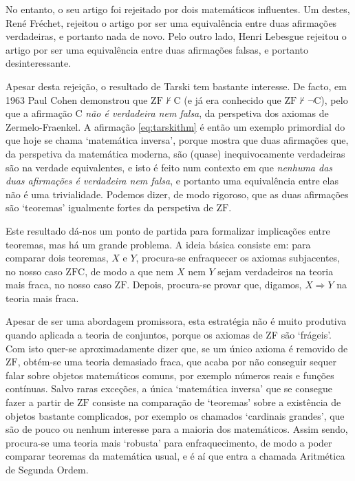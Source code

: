 No entanto, o seu artigo foi rejeitado por dois matemáticos influentes. Um destes, René Fréchet, rejeitou o artigo por ser uma equivalência entre duas afirmações verdadeiras, e portanto nada de novo. Pelo outro lado, Henri Lebesgue rejeitou o artigo por ser uma equivalência entre duas afirmações falsas, e portanto desinteressante.

Apesar desta rejeição, o resultado de Tarski tem bastante interesse. De facto, em 1963 Paul Cohen demonstrou que $\mathrm{ZF} \nvdash \mathrm{C}$ (e já era conhecido que $\mathrm{ZF} \nvdash \neg \mathrm{C}$), pelo que a afirmação $\mathrm{C}$ \emph{não é verdadeira nem falsa}, da perspetiva dos axiomas de Zermelo-Fraenkel. A afirmação \eqref{eq:tarskithm} é então um exemplo primordial do que hoje se chama `matemática inversa', porque mostra que duas afirmações que, da perspetiva da matemática moderna, são (quase) inequivocamente verdadeiras são na verdade equivalentes, e isto é feito num contexto em que \emph{nenhuma das duas afirmações é verdadeira nem falsa}, e portanto uma equivalência entre elas não é uma trivialidade. Podemos dizer, de modo rigoroso, que as duas afirmações são `teoremas' igualmente fortes da perspetiva de $\mathrm{ZF}$.

Este resultado dá-nos um ponto de partida para formalizar implicações entre teoremas, mas há um grande problema. A ideia básica consiste em: para comparar dois teoremas, $X$ e $Y$, procura-se enfraquecer os axiomas subjacentes, no nosso caso $\mathrm{ZFC}$, de modo a que nem $X$ nem $Y$ sejam verdadeiros na teoria mais fraca, no nosso caso $\mathrm{ZF}$. Depois, procura-se provar que, digamos, $X \Rightarrow Y$ na teoria mais fraca.

Apesar de ser uma abordagem promissora, esta estratégia não é muito produtiva quando aplicada a teoria de conjuntos, porque os axiomas de ZF são `frágeis'. Com isto quer-se aproximadamente dizer que, se um único axioma é removido de $\mathrm{ZF}$, obtém-se uma teoria demasiado fraca, que acaba por não conseguir sequer falar sobre objetos matemáticos comuns, por exemplo números reais e funções contínuas. Salvo raras exceções, a única `matemática inversa' que se consegue fazer a partir de $\mathrm{ZF}$ consiste na comparação de `teoremas' sobre a existência de objetos bastante complicados, por exemplo os chamados `cardinais grandes', que são de pouco ou nenhum interesse para a maioria dos matemáticos. Assim sendo, procura-se uma teoria mais `robusta' para enfraquecimento, de modo a poder comparar teoremas da matemática usual, e é aí que entra a chamada Aritmética de Segunda Ordem.

